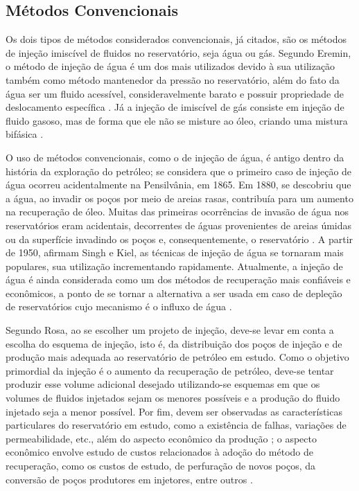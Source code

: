 \subsection{M\'{e}todos Convencionais}
Os dois tipos de m\'{e}todos considerados convencionais, j\'{a} citados, s\~{a}o os m\'{e}todos de inje\c{c}\~{a}o imisc\'{i}vel de fluidos no reservat\'{o}rio, seja \'{a}gua ou g\'{a}s. Segundo Eremin, o m\'{e}todo de inje\c{c}\~{a}o de \'{a}gua \'{e} um dos mais utilizados devido \`{a} sua utiliza\c{c}\~{a}o tamb\'{e}m como m\'{e}todo mantenedor da press\~{a}o no reservat\'{o}rio, al\'{e}m do fato da \'{a}gua ser um fluido acess\'{i}vel, consideravelmente barato e possuir propriedade de deslocamento espec\'{i}fica \cite{eremin}. J\'{a} a inje\c{c}\~{a}o de imisc\'{i}vel de g\'{a}s consiste em inje\c{c}\~{a}o de fluido gasoso, mas de forma que ele n\~{a}o se misture ao \'{o}leo, criando uma mistura bif\'{a}sica \cite[p. 564]{engres}.

O uso de m\'{e}todos convencionais, como o de inje\c{c}\~{a}o de \'{a}gua, \'{e} antigo dentro da hist\'{o}ria da explora\c{c}\~{a}o do petr\'{o}leo; se considera que o primeiro caso de inje\c{c}\~{a}o de \'{a}gua ocorreu acidentalmente na Pensilv\^{a}nia, em 1865. Em 1880, se descobriu que a \'{a}gua, ao invadir os po\c{c}os por meio de areias rasas, contribu\'{i}a para um aumento na recupera\c{c}\~{a}o de \'{o}leo. Muitas das primeiras ocorr\^{e}ncias de invas\~{a}o de \'{a}gua nos reservat\'{o}rios eram acidentais, decorrentes de \'{a}guas provenientes de areias \'{u}midas ou da superf\'{i}cie invadindo os po\c{c}os e, consequentemente, o reservat\'{o}rio \cite{adeniyi2008}. A partir de 1950, afirmam Singh e Kiel, as t\'{e}cnicas de inje\c{c}\~{a}o de \'{a}gua se tornaram mais populares, sua utiliza\c{c}\~{a}o incrementando rapidamente. Atualmente, a inje\c{c}\~{a}o de \'{a}gua \'{e} ainda considerada como um dos m\'{e}todos de recupera\c{c}\~{a}o mais confi\'{a}veis e econ\^{o}micos, a ponto de se tornar a alternativa a ser usada em caso de deple\c{c}\~{a}o de reservat\'{o}rios cujo mecanismo \'{e} o influxo de \'{a}gua \cite{singh1982}.

Segundo Rosa, ao se escolher um projeto de inje\c{c}\~{a}o, deve-se levar em conta a escolha do esquema de inje\c{c}\~{a}o, isto \'{e}, da distribui\c{c}\~{a}o dos po\c{c}os de inje\c{c}\~{a}o e de produ\c{c}\~{a}o mais adequada ao reservat\'{o}rio de petr\'{o}leo em estudo. Como o objetivo primordial da inje\c{c}\~{a}o \'{e} o aumento da recupera\c{c}\~{a}o de petr\'{o}leo, deve-se tentar produzir esse volume adicional desejado utilizando-se esquemas em que os volumes de fluidos injetados sejam os menores poss\'{i}veis e a produ\c{c}\~{a}o do fluido injetado seja a menor poss\'{i}vel. Por fim, devem ser observadas as caracter\'{i}sticas particulares do reservat\'{o}rio em estudo, como a exist\^{e}ncia de falhas, varia\c{c}\~{o}es de permeabilidade, etc., al\'{e}m do aspecto econ\^{o}mico da produ\c{c}\~{a}o \cite[p. 564]{engres}; o aspecto econ\^{o}mico envolve estudo de custos relacionados \`{a} ado\c{c}\~{a}o do m\'{e}todo de recupera\c{c}\~{a}o, como os custos de estudo, de perfura\c{c}\~{a}o de novos po\c{c}os, da convers\~{a}o de po\c{c}os produtores em injetores, entre outros \cite{latil}.

